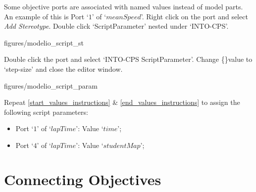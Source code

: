 \documentclass[11pt,a4paper]{../tutorial}
\begin{document}
\begin{instructions}
\newpage

\item \label{start_values_instructions} Some objective ports are associated with named values instead of model parts. An example of this is Port `$1$' of `$meanSpeed$'. Right click on the port and select \emph{Add Stereotype}. Double click `ScriptParameter' nested under `INTO-CPS'.

\begin{center}
\begin{annotation}[width=0.7\linewidth]{figures/modelio_script_st}
    \end{annotation}
\end{center}

\item \label{end_values_instructions}Double click the port and select `INTO-CPS \menusep ScriptParameter'. Change \{\}value to `step-size' and close the editor window.

\begin{center}
\begin{annotation}[width=0.7\linewidth]{figures/modelio_script_param}
    \end{annotation}
\end{center}

\item Repeat \ref{start_values_instructions} \& \ref{end_values_instructions} to assign the following script parameters:
\begin{itemize}
	\item Port `$1$' of `$lapTime$': Value `$time$';
	\item Port `$4$' of `$lapTime$': Value `$studentMap$';
\end{itemize}

\end{instructions}






\newpage
\section{Connecting Objectives}
\end{document}
